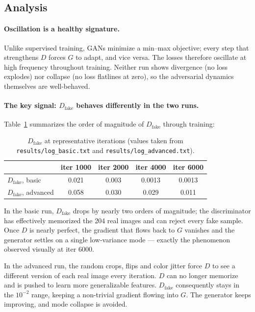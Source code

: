 \documentclass[11pt]{article}
\begin{document}
\subsection{Analysis}

\paragraph{Oscillation is a healthy signature.}
Unlike supervised training, GANs minimize a min–max objective; every step that
strengthens $D$ forces $G$ to adapt, and vice versa. The losses therefore
oscillate at high frequency throughout training. Neither run shows divergence
(no loss explodes) nor collapse (no loss flatlines at zero), so the adversarial
dynamics themselves are well-behaved.

\paragraph{The key signal: $D_\text{fake}$ behaves differently in the two
runs.}
Table~\ref{tab:dfake} summarizes the order of magnitude of $D_\text{fake}$
through training:

\begin{table}[H]
\centering
\begin{tabular}{lcccc}
\toprule
 & iter 1000 & iter 2000 & iter 4000 & iter 6000 \\
\midrule
$D_\text{fake}$, basic    & 0.021 & 0.003 & 0.0013 & 0.0013 \\
$D_\text{fake}$, advanced & 0.058 & 0.030 & 0.029  & 0.011 \\
\bottomrule
\end{tabular}
\caption{$D_\text{fake}$ at representative iterations (values taken from
\texttt{results/log\_basic.txt} and \texttt{results/log\_advanced.txt}).}
\label{tab:dfake}
\end{table}

In the basic run, $D_\text{fake}$ drops by nearly two orders of magnitude; the
discriminator has effectively memorized the 204 real images and can reject
every fake sample. Once $D$ is nearly perfect, the gradient that flows back to
$G$ vanishes and the generator settles on a single low-variance mode — exactly
the phenomenon observed visually at iter 6000.

In the advanced run, the random crops, flips and color jitter force $D$ to see
a different version of each real image every iteration. $D$ can no longer
memorize and is pushed to learn more generalizable features. $D_\text{fake}$
consequently stays in the $10^{-2}$ range, keeping a non-trivial gradient
flowing into $G$. The generator keeps improving, and mode collapse is avoided.
\end{document}
